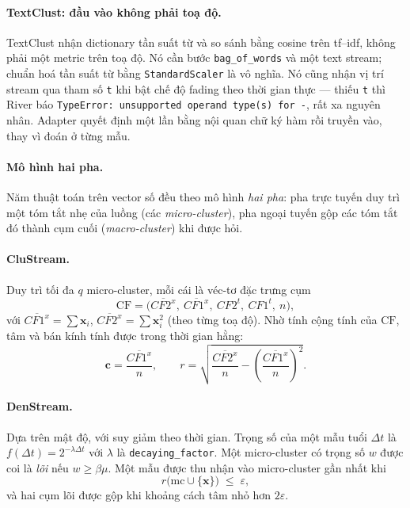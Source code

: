 \documentclass[11pt,a4paper]{article}
\theoremstyle{remark}
\newcommand{\xt}{\mathbf{x}}
\begin{document}
\paragraph{TextClust: đầu vào không phải toạ độ.}
TextClust nhận dictionary tần suất từ và so sánh bằng cosine trên tf--idf, không
phải một metric trên toạ độ. Nó cần bước \texttt{bag\_of\_words} và một text
stream; chuẩn hoá tần suất từ bằng \texttt{StandardScaler} là vô nghĩa. Nó cũng
nhận vị trí stream qua tham số \texttt{t} khi bật chế độ fading theo thời gian
thực --- thiếu \texttt{t} thì River báo
\texttt{TypeError: unsupported operand type(s) for -}, rất xa nguyên nhân. Adapter
quyết định một lần bằng nội quan chữ ký hàm rồi truyền vào, thay vì đoán ở từng
mẫu.

\paragraph{Mô hình hai pha.}
Năm thuật toán trên vector số đều theo mô hình \emph{hai pha}: pha trực tuyến duy
trì một tóm tắt nhẹ của luồng (các \emph{micro-cluster}), pha ngoại tuyến gộp các
tóm tắt đó thành cụm cuối (\emph{macro-cluster}) khi được hỏi.

\paragraph{CluStream.}
Duy trì tối đa $q$ micro-cluster, mỗi cái là véc-tơ đặc trưng cụm
\begin{equation}
  \mathrm{CF} = \big(\overline{CF2^x},\ \overline{CF1^x},\ CF2^t,\ CF1^t,\ n\big),
\end{equation}
với $\overline{CF1^x}=\sum \xt_i$, $\overline{CF2^x}=\sum \xt_i^2$ (theo từng
toạ độ). Nhờ tính cộng tính của $\mathrm{CF}$, tâm và bán kính tính được trong
thời gian hằng:
\begin{equation}
  \mathbf{c} = \frac{\overline{CF1^x}}{n},
  \qquad
  r = \sqrt{\frac{\overline{CF2^x}}{n} - \left(\frac{\overline{CF1^x}}{n}\right)^{\!2}}.
\end{equation}

\paragraph{DenStream.}
Dựa trên mật độ, với suy giảm theo thời gian. Trọng số của một mẫu tuổi $\Delta t$
là $f(\Delta t) = 2^{-\lambda \Delta t}$ với $\lambda$ là \texttt{decaying\_factor}.
Một micro-cluster có trọng số $w$ được coi là \emph{lõi} nếu $w \ge \beta\mu$.
Một mẫu được thu nhận vào micro-cluster gần nhất khi
\begin{equation}
  \label{eq:denstream-eps}
  r\big(\text{mc} \cup \{\xt\}\big) \;\le\; \varepsilon ,
\end{equation}
và hai cụm lõi được gộp khi khoảng cách tâm nhỏ hơn $2\varepsilon$.
\end{document}
